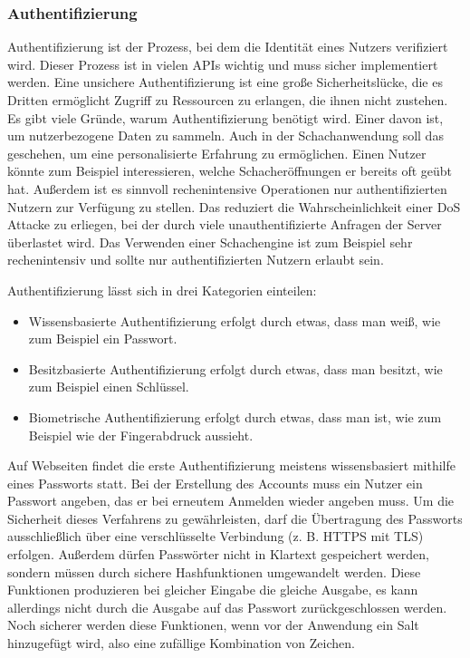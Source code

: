 \cite{masse_rest_2012}

\subsubsection{Authentifizierung}
\label{cp:auth}
Authentifizierung ist der Prozess, bei dem die Identität eines Nutzers verifiziert wird.
Dieser Prozess ist in vielen APIs wichtig und muss sicher implementiert werden. Eine unsichere Authentifizierung ist eine große Sicherheitslücke, die es Dritten ermöglicht Zugriff zu Ressourcen zu erlangen, die ihnen nicht zustehen.
Es gibt viele Gründe, warum Authentifizierung benötigt wird. Einer davon ist, um nutzerbezogene Daten zu sammeln.
Auch in der Schachanwendung soll das geschehen, um eine personalisierte Erfahrung zu ermöglichen.
Einen Nutzer könnte zum Beispiel interessieren, welche Schacheröffnungen er bereits oft geübt hat. Außerdem ist es sinnvoll rechenintensive Operationen nur authentifizierten Nutzern zur Verfügung zu stellen. Das reduziert die Wahrscheinlichkeit einer DoS Attacke zu erliegen, bei der durch viele unauthentifizierte Anfragen der Server überlastet wird. Das Verwenden einer Schachengine ist zum Beispiel sehr rechenintensiv und sollte nur authentifizierten Nutzern erlaubt sein.

Authentifizierung lässt sich in drei Kategorien einteilen:
\begin{itemize}
    \item Wissensbasierte Authentifizierung erfolgt durch etwas, dass man weiß, wie zum Beispiel ein Passwort.
    \item Besitzbasierte Authentifizierung erfolgt durch etwas, dass man besitzt, wie zum Beispiel einen Schlüssel.
    \item Biometrische Authentifizierung erfolgt durch etwas, dass man ist, wie zum Beispiel wie der Fingerabdruck aussieht.
\end{itemize}

Auf Webseiten findet die erste Authentifizierung meistens wissensbasiert mithilfe eines Passworts statt. Bei der Erstellung des Accounts muss ein Nutzer ein Passwort angeben, das er bei erneutem Anmelden wieder angeben muss.
Um die Sicherheit dieses Verfahrens zu gewährleisten, darf die Übertragung des Passworts ausschließlich über eine verschlüsselte Verbindung (z. B. HTTPS mit TLS) erfolgen. Außerdem dürfen Passwörter nicht in Klartext gespeichert werden, sondern müssen durch sichere Hashfunktionen umgewandelt werden. Diese Funktionen produzieren bei gleicher Eingabe die gleiche Ausgabe, es kann allerdings nicht durch die Ausgabe auf das Passwort zurückgeschlossen werden. Noch sicherer werden diese Funktionen, wenn vor der Anwendung ein Salt hinzugefügt wird, also eine zufällige Kombination von Zeichen.

